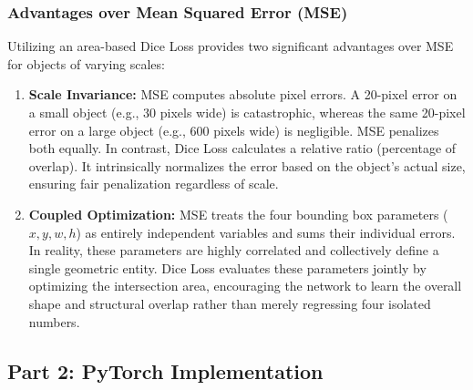 \documentclass{article}
\begin{document}
\subsubsection*{Advantages over Mean Squared Error (MSE)}
Utilizing an area-based Dice Loss provides two significant advantages over MSE for objects of varying scales:

\begin{enumerate}
	\item \textbf{Scale Invariance:} MSE computes absolute pixel errors. A 20-pixel error on a small object (e.g., 30 pixels wide) is catastrophic, whereas the same 20-pixel error on a large object (e.g., 600 pixels wide) is negligible. MSE penalizes both equally. In contrast, Dice Loss calculates a relative ratio (percentage of overlap). It intrinsically normalizes the error based on the object's actual size, ensuring fair penalization regardless of scale.
	\item \textbf{Coupled Optimization:} MSE treats the four bounding box parameters ($x, y, w, h$) as entirely independent variables and sums their individual errors. In reality, these parameters are highly correlated and collectively define a single geometric entity. Dice Loss evaluates these parameters jointly by optimizing the intersection area, encouraging the network to learn the overall shape and structural overlap rather than merely regressing four isolated numbers.
\end{enumerate}

\subsection{Part 2: PyTorch Implementation}
\end{document}
